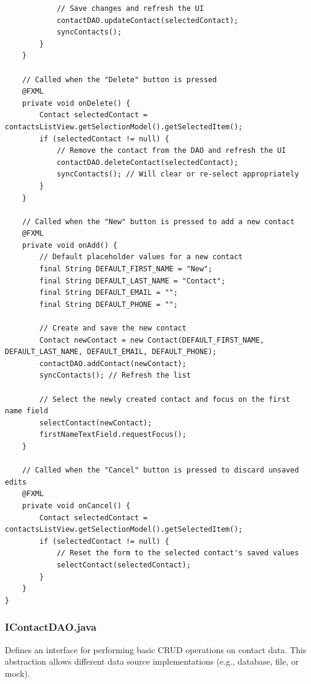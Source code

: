 \documentclass{article}
\begin{document}
\begin{verbatim}
            // Save changes and refresh the UI
            contactDAO.updateContact(selectedContact);
            syncContacts();
        }
    }

    // Called when the "Delete" button is pressed
    @FXML
    private void onDelete() {
        Contact selectedContact = contactsListView.getSelectionModel().getSelectedItem();
        if (selectedContact != null) {
            // Remove the contact from the DAO and refresh the UI
            contactDAO.deleteContact(selectedContact);
            syncContacts(); // Will clear or re-select appropriately
        }
    }

    // Called when the "New" button is pressed to add a new contact
    @FXML
    private void onAdd() {
        // Default placeholder values for a new contact
        final String DEFAULT_FIRST_NAME = "New";
        final String DEFAULT_LAST_NAME = "Contact";
        final String DEFAULT_EMAIL = "";
        final String DEFAULT_PHONE = "";

        // Create and save the new contact
        Contact newContact = new Contact(DEFAULT_FIRST_NAME, DEFAULT_LAST_NAME, DEFAULT_EMAIL, DEFAULT_PHONE);
        contactDAO.addContact(newContact);
        syncContacts(); // Refresh the list

        // Select the newly created contact and focus on the first name field
        selectContact(newContact);
        firstNameTextField.requestFocus();
    }

    // Called when the "Cancel" button is pressed to discard unsaved edits
    @FXML
    private void onCancel() {
        Contact selectedContact = contactsListView.getSelectionModel().getSelectedItem();
        if (selectedContact != null) {
            // Reset the form to the selected contact's saved values
            selectContact(selectedContact);
        }
    }
}
\end{verbatim}

\subsubsection*{IContactDAO.java}
Defines an interface for performing basic CRUD operations on contact data. This abstraction allows different data source implementations (e.g., database, file, or mock).
\end{document}
